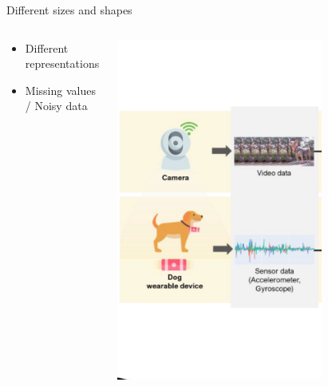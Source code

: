 \begin{frame}{Different sizes and shapes}
    \begin{columns}
    \begin{column}{0.5\textwidth}
       \begin{itemize}
        \item Different representations
        \item Missing values / Noisy data
    \end{itemize}
    \end{column}
    \begin{column}{0.5\textwidth}
        \begin{center}
        \includegraphics[width=0.7\textwidth]{assets/data_sizes_shapes.png}
        \end{center}
    \end{column}
    \end{columns}
    
\end{frame}


